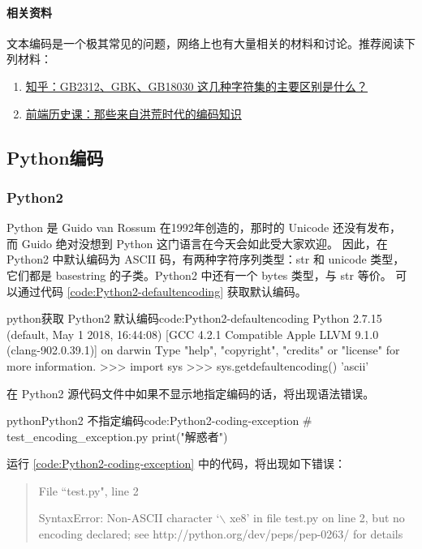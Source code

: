 \paragraph*{相关资料}
文本编码是一个极其常见的问题，网络上也有大量相关的材料和讨论。推荐阅读下列材料：
\begin{enumerate}
  \item \href{https://www.zhihu.com/question/19677619}{知乎：GB2312、GBK、GB18030 这几种字符集的主要区别是什么？}
  \item \href{http://web.jobbole.com/89552/}{前端历史课：那些来自洪荒时代的编码知识}
\end{enumerate}

\subsection{Python编码}

\subsubsection{Python2}
Python 是 Guido van Rossum 在1992年创造的，那时的 Unicode 还没有发布，
而 Guido 绝对没想到 Python 这门语言在今天会如此受大家欢迎。
因此，在 Python2 中默认编码为 ASCII 码，有两种字符序列类型：str 和 unicode 类型，
它们都是 basestring 的子类。Python2 中还有一个 bytes 类型，与 str 等价。
可以通过代码 \ref{code:Python2-defaultencoding} 获取默认编码。

\begin{jcode}{python}{获取 Python2 默认编码}{code:Python2-defaultencoding}
Python 2.7.15 (default, May  1 2018, 16:44:08)
[GCC 4.2.1 Compatible Apple LLVM 9.1.0 (clang-902.0.39.1)] on darwin
Type "help", "copyright", "credits" or "license" for more information.
>>> import sys
>>> sys.getdefaultencoding()
'ascii'
\end{jcode}

在 Python2 源代码文件中如果不显示地指定编码的话，将出现语法错误。

\begin{jcode}{python}{Python2 不指定编码}{code:Python2-coding-exception}
# test_encoding_exception.py
print("解惑者")
\end{jcode}

运行 \ref{code:Python2-coding-exception} 中的代码，将出现如下错误：
\begin{quote}
File ``test.py", line 2

SyntaxError: Non-ASCII character `$\backslash$ xe8' in file test.py on line 2, but no encoding declared; see http://python.org/dev/peps/pep-0263/ for details
\end{quote}

